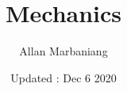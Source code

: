 \title{Mechanics}
\author{Allan Marbaniang}
\date{Updated : Dec 6 2020}
\maketitle
\tableofcontents



